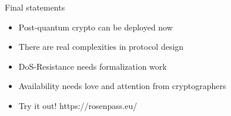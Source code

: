 \begin{frame}{Final statements}
  \begin{itemize}
    \item Post-quantum crypto can be deployed now
    \item There are real complexities in protocol design
    \item DoS-Resistance needs formalization work
    \item Availability needs love and attention from cryptographers
    \item Try it out! https://rosenpass.eu/
  \end{itemize}
\end{frame}

